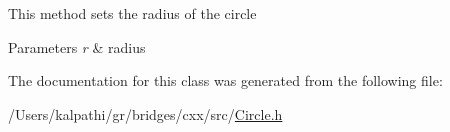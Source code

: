 This method sets the radius of the circle


\begin{DoxyParams}{Parameters}
{\em r} & radius \\
\hline
\end{DoxyParams}


The documentation for this class was generated from the following file\+:\begin{DoxyCompactItemize}
\item 
/\+Users/kalpathi/gr/bridges/cxx/src/\mbox{\hyperlink{_circle_8h}{Circle.\+h}}\end{DoxyCompactItemize}
